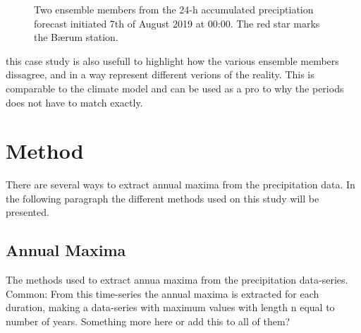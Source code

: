 \begin{figure}[hbt!]%
    \centering
    \qquad
    \caption{Two ensemble members from the 24-h accumulated preciptiation forecast initiated 7th of August 2019 at 00:00. The red star marks the Bærum station.}%
    \label{fig:ensmember}%
\end{figure}

this case study is also usefull to highlight how the various ensemble members dissagree, and in a way represent different verions of the reality. This is comparable to the climate model and can be used as a pro to why the periods does not have to match exactly.  
\section{Method}

There are several ways to extract annual maxima from the precipitation data. In the following paragraph the different methods used on this study will be presented.  
\subsection{Annual Maxima}

The methods used to extract annua maxima from the precipitation data-series. 
Common:
From this time-series the annual maxima is extracted for each duration, making a data-series with maximum values with length n equal to number of years.  Something more here or add this to all of them?

